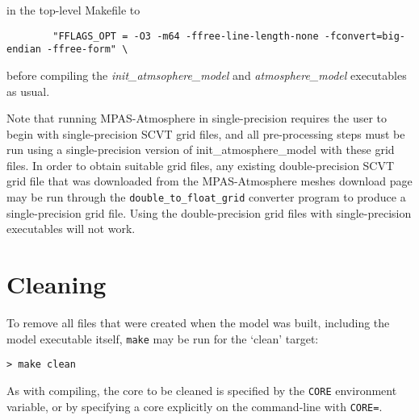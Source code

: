 \noindent in the top-level Makefile to

\begin{verbatim}
        "FFLAGS_OPT = -O3 -m64 -ffree-line-length-none -fconvert=big-endian -ffree-form" \
\end{verbatim}

\noindent before compiling the {\em init\_atmsophere\_model} and {\em atmosphere\_model} executables as usual.

Note that running MPAS-Atmosphere in single-precision requires the user to begin with single-precision SCVT grid files, 
and all pre-processing steps must be run using a single-precision version of init\_atmosphere\_model with these grid files. 
In order to obtain suitable grid files, any existing double-precision SCVT grid file that was downloaded from the MPAS-Atmosphere 
meshes download page may be run through the {\tt double\_to\_float\_grid} converter program to produce a single-precision grid file. 
Using the double-precision grid files with single-precision executables will not work.

\section{Cleaning}

To remove all files  that were created when the model was built,
including the model executable itself, {\tt make} may be run for the
`clean' target:

\vspace{12pt}
{\tt > make clean}
\vspace{12pt}

As with compiling, the core to be cleaned is specified by the {\tt CORE}
environment variable, or by specifying a core explicitly on the
command-line with {\tt CORE=}.
